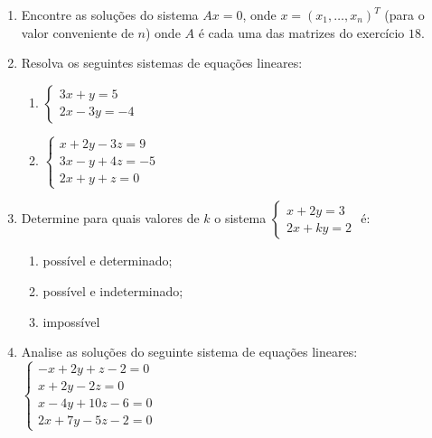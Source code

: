 \documentclass[oneside,a4paper,12pt]{article}
\begin{document}
\begin{enumerate}
	\item Encontre as soluções do sistema $Ax=0$, onde $x = (x_1, \dots, x_n)^{T}$ (para o valor conveniente de $n$) onde $A$ é cada uma das matrizes do exercício $18$.
	
	\item Resolva os seguintes sistemas de equações lineares:
	\begin{multicols}{2}
	\begin{enumerate}
		\item $\begin{cases}
		3x + y = 5 \\
		2x - 3y = -4
		\end{cases}$
		\item $\begin{cases}
		x + 2y - 3z = 9 \\
		3x - y + 4z = -5 \\
		2x + y + z = 0
		\end{cases}$
	\end{enumerate}
	\end{multicols}	
	
	\item Determine para quais valores de $k$ o sistema $\begin{cases}
	x + 2y = 3 \\
	2x + ky = 2
	\end{cases}
	$ é:
	\begin{enumerate}
		\item possível e determinado;
		\item possível e indeterminado;
		\item impossível
	\end{enumerate}

	\item Analise as soluções do seguinte sistema de equações lineares: $\begin{cases}
	-x + 2y + z - 2 = 0 \\
	x + 2y - 2z = 0 \\
	x - 4y + 10z - 6 = 0 \\
	2x + 7y - 5z - 2 = 0
	\end{cases}
	$
	

\end{enumerate}
\end{document}
